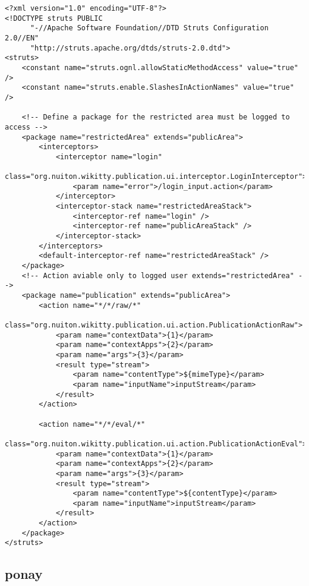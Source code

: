 \begin{lstlisting}
<?xml version="1.0" encoding="UTF-8"?>
<!DOCTYPE struts PUBLIC 
	  "-//Apache Software Foundation//DTD Struts Configuration 2.0//EN"
	  "http://struts.apache.org/dtds/struts-2.0.dtd">
<struts>
    <constant name="struts.ognl.allowStaticMethodAccess" value="true" />
    <constant name="struts.enable.SlashesInActionNames" value="true" />

    <!-- Define a package for the restricted area must be logged to access -->
    <package name="restrictedArea" extends="publicArea">
        <interceptors>
            <interceptor name="login"
                class="org.nuiton.wikitty.publication.ui.interceptor.LoginInterceptor">
                <param name="error">/login_input.action</param>
            </interceptor>
            <interceptor-stack name="restrictedAreaStack">
                <interceptor-ref name="login" />
                <interceptor-ref name="publicAreaStack" />
            </interceptor-stack>
        </interceptors>
        <default-interceptor-ref name="restrictedAreaStack" />
    </package>
    <!-- Action aviable only to logged user extends="restrictedArea" -->
    <package name="publication" extends="publicArea">
        <action name="*/*/raw/*"
            class="org.nuiton.wikitty.publication.ui.action.PublicationActionRaw">
            <param name="contextData">{1}</param>
            <param name="contextApps">{2}</param>
            <param name="args">{3}</param>
            <result type="stream">
                <param name="contentType">${mimeType}</param>
                <param name="inputName">inputStream</param>
            </result>
        </action>

        <action name="*/*/eval/*"
            class="org.nuiton.wikitty.publication.ui.action.PublicationActionEval">
            <param name="contextData">{1}</param>
            <param name="contextApps">{2}</param>
            <param name="args">{3}</param>
            <result type="stream">
                <param name="contentType">${contentType}</param>
                <param name="inputName">inputStream</param>
            </result>
        </action>
    </package>
</struts>
\end{lstlisting}





\subsection*{ponay}
